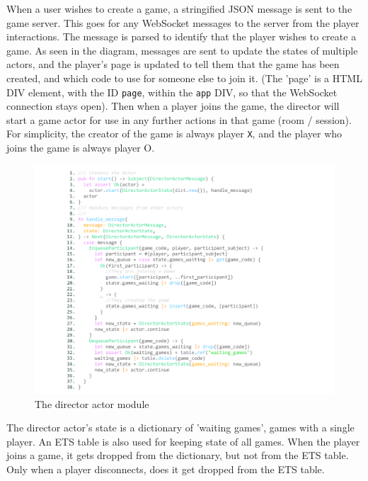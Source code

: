 \documentclass[]{final}
\begin{document}
When a user wishes to create a game, a stringified JSON message is sent to the game server.
This goes for any WebSocket messages to the server from the player interactions.
The message is parsed to identify that the player wishes to create a game. As seen in the diagram,
messages are sent to update the states of multiple actors, and the player's page is updated to tell
them that the game has been created, and which code to use for someone else to join it.
(The 'page' is a HTML DIV element, with the ID \lstinline|page|, within the \lstinline|app| DIV, so that the WebSocket
connection stays open). Then when a player joins the game, the director will start
a game actor for use in any further actions in that game (room / session). For simplicity,
the creator of the game is always player \lstinline|X|, and the player who joins the game is always player O.

\begin{figure}[H]
  \centering
  \includegraphics[width=\textwidth]{director_actor.pdf}
  \caption{The director actor module}
\end{figure}

The director actor's state is a dictionary of 'waiting games',
games with a single player. An ETS table is also used for keeping
state of all games. When the player joins a game, it gets dropped
from the dictionary, but not from the ETS table. Only when a player
disconnects, does it get dropped from the ETS table.

\newpage
\end{document}
